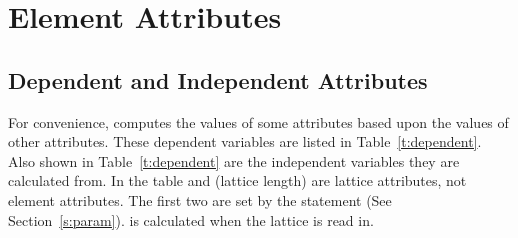 \chapter {Element Attributes}
\label{c:attrib}

\section{Dependent and Independent Attributes} 
\label{s:depend} 

For convenience, \bmad computes the values of some attributes based
upon the values of other attributes. These dependent variables are
listed in Table~\ref{t:dependent}. Also shown in
Table~\ref{t:dependent} are the independent variables they are
calculated from.  In the table  and  (lattice
length) are lattice attributes, not element attributes. The first two
are set by the  statement (See
Section~\ref{s:param}).  is calculated when the
lattice is read in.

\begin{table}[h]
\caption[Table of dependent variables.]{Table of dependent variables and 
  the independent variables 
they are calculated from.}
\label{t:dependent}
\end{table}

